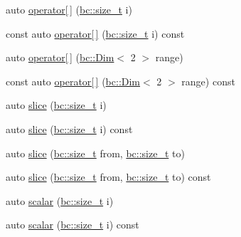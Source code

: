 \begin{DoxyCompactItemize}
\item 
auto \hyperlink{classbc_1_1tensors_1_1Tensor__Accessor__Base_ad6a8f0474abed58f4f951ce023855050}{operator\mbox{[}$\,$\mbox{]}} (\hyperlink{namespacebc_aaf8e3fbf99b04b1b57c4f80c6f55d3c5}{bc\+::size\+\_\+t} i)
\item 
const auto \hyperlink{classbc_1_1tensors_1_1Tensor__Accessor__Base_a5a2b24905369aff2b093cd7dec9d4299}{operator\mbox{[}$\,$\mbox{]}} (\hyperlink{namespacebc_aaf8e3fbf99b04b1b57c4f80c6f55d3c5}{bc\+::size\+\_\+t} i) const
\item 
auto \hyperlink{classbc_1_1tensors_1_1Tensor__Accessor__Base_a9eb8b7a2c9e01bf7b2842cd8c6f039d3}{operator\mbox{[}$\,$\mbox{]}} (\hyperlink{structbc_1_1Dim}{bc\+::\+Dim}$<$ 2 $>$ range)
\item 
const auto \hyperlink{classbc_1_1tensors_1_1Tensor__Accessor__Base_a957d074b5d1d1ac70d0fb6bd70184179}{operator\mbox{[}$\,$\mbox{]}} (\hyperlink{structbc_1_1Dim}{bc\+::\+Dim}$<$ 2 $>$ range) const
\item 
auto \hyperlink{classbc_1_1tensors_1_1Tensor__Accessor__Base_a5496b0377302438d13d6a742690327c3}{slice} (\hyperlink{namespacebc_aaf8e3fbf99b04b1b57c4f80c6f55d3c5}{bc\+::size\+\_\+t} i)
\item 
auto \hyperlink{classbc_1_1tensors_1_1Tensor__Accessor__Base_af2df04474c2c8e1597fff20f4baf7308}{slice} (\hyperlink{namespacebc_aaf8e3fbf99b04b1b57c4f80c6f55d3c5}{bc\+::size\+\_\+t} i) const
\item 
auto \hyperlink{classbc_1_1tensors_1_1Tensor__Accessor__Base_a6fa6239684251182ad8a3e2de90ec49e}{slice} (\hyperlink{namespacebc_aaf8e3fbf99b04b1b57c4f80c6f55d3c5}{bc\+::size\+\_\+t} from, \hyperlink{namespacebc_aaf8e3fbf99b04b1b57c4f80c6f55d3c5}{bc\+::size\+\_\+t} to)
\item 
auto \hyperlink{classbc_1_1tensors_1_1Tensor__Accessor__Base_ae6922d7d801358130a580c28500d779a}{slice} (\hyperlink{namespacebc_aaf8e3fbf99b04b1b57c4f80c6f55d3c5}{bc\+::size\+\_\+t} from, \hyperlink{namespacebc_aaf8e3fbf99b04b1b57c4f80c6f55d3c5}{bc\+::size\+\_\+t} to) const
\item 
auto \hyperlink{classbc_1_1tensors_1_1Tensor__Accessor__Base_a94673405343bb76655fbba416ec53f3e}{scalar} (\hyperlink{namespacebc_aaf8e3fbf99b04b1b57c4f80c6f55d3c5}{bc\+::size\+\_\+t} i)
\item 
auto \hyperlink{classbc_1_1tensors_1_1Tensor__Accessor__Base_ae33a59b508f009a9d252532328bc1e9b}{scalar} (\hyperlink{namespacebc_aaf8e3fbf99b04b1b57c4f80c6f55d3c5}{bc\+::size\+\_\+t} i) const

\end{DoxyCompactItemize}
